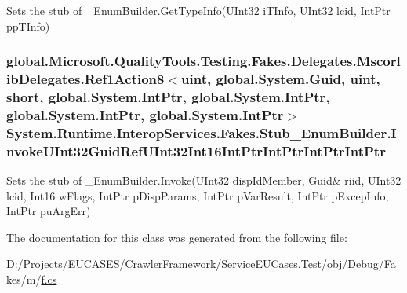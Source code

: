 Sets the stub of \-\_\-\-Enum\-Builder.\-Get\-Type\-Info(\-U\-Int32 i\-T\-Info, U\-Int32 lcid, Int\-Ptr pp\-T\-Info)

\hypertarget{class_system_1_1_runtime_1_1_interop_services_1_1_fakes_1_1_stub___enum_builder_a299d2b9695b08416a3e667ecff3d39cf}{
\subsubsection[{Invoke\-U\-Int32\-Guid\-Ref\-U\-Int32\-Int16\-Int\-Ptr\-Int\-Ptr\-Int\-Ptr\-Int\-Ptr}]{\setlength{\rightskip}{0pt plus 5cm}global.\-Microsoft.\-Quality\-Tools.\-Testing.\-Fakes.\-Delegates.\-Mscorlib\-Delegates.\-Ref1\-Action8$<$uint, global.\-System.\-Guid, uint, short, global.\-System.\-Int\-Ptr, global.\-System.\-Int\-Ptr, global.\-System.\-Int\-Ptr, global.\-System.\-Int\-Ptr$>$ System.\-Runtime.\-Interop\-Services.\-Fakes.\-Stub\-\_\-\-Enum\-Builder.\-Invoke\-U\-Int32\-Guid\-Ref\-U\-Int32\-Int16\-Int\-Ptr\-Int\-Ptr\-Int\-Ptr\-Int\-Ptr}}\label{class_system_1_1_runtime_1_1_interop_services_1_1_fakes_1_1_stub___enum_builder_a299d2b9695b08416a3e667ecff3d39cf}


Sets the stub of \-\_\-\-Enum\-Builder.\-Invoke(U\-Int32 disp\-Id\-Member, Guid\& riid, U\-Int32 lcid, Int16 w\-Flags, Int\-Ptr p\-Disp\-Params, Int\-Ptr p\-Var\-Result, Int\-Ptr p\-Excep\-Info, Int\-Ptr pu\-Arg\-Err)



The documentation for this class was generated from the following file\-:\begin{DoxyCompactItemize}
\item 
D\-:/\-Projects/\-E\-U\-C\-A\-S\-E\-S/\-Crawler\-Framework/\-Service\-E\-U\-Cases.\-Test/obj/\-Debug/\-Fakes/m/\hyperlink{m_2f_8cs}{f.\-cs}\end{DoxyCompactItemize}
